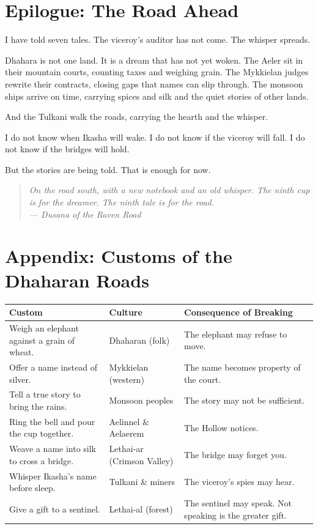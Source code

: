 \documentclass[10pt,twoside]{book}
\newcommand{\dusana}[1]{\begin{quote}\itshape #1 \\ --- Dusana of the Raven Road\end{quote}}
\begin{document}
\chapter*{Epilogue: The Road Ahead}

I have told seven tales. The viceroy's auditor has not come. The whisper spreads.

Dhahara is not one land. It is a dream that has not yet woken. The Aeler sit in their mountain courts, counting taxes and weighing grain. The Mykkielan judges rewrite their contracts, closing gaps that names can slip through. The monsoon ships arrive on time, carrying spices and silk and the quiet stories of other lands.

And the Tulkani walk the roads, carrying the hearth and the whisper.

I do not know when Ikasha will wake. I do not know if the viceroy will fall. I do not know if the bridges will hold.

But the stories are being told. That is enough for now.

\dusana{On the road south, with a new notebook and an old whisper. The ninth cup is for the dreamer. The ninth tale is for the road.}

\chapter*{Appendix: Customs of the Dhaharan Roads}

\begin{table}[h]
\centering
\begin{tabularx}{\textwidth}{p{4cm} p{4cm} X}
\toprule
\textbf{Custom} & \textbf{Culture} & \textbf{Consequence of Breaking} \\
\midrule
Weigh an elephant against a grain of wheat. & Dhaharan (folk) & The elephant may refuse to move. \\
Offer a name instead of silver. & Mykkielan (western) & The name becomes property of the court. \\
Tell a true story to bring the rains. & Monsoon peoples & The story may not be sufficient. \\
Ring the bell and pour the cup together. & Aelinnel \& Aelaerem & The Hollow notices. \\
Weave a name into silk to cross a bridge. & Lethai-ar (Crimson Valley) & The bridge may forget you. \\
Whisper Ikasha's name before sleep. & Tulkani \& miners & The viceroy's spies may hear. \\
Give a gift to a sentinel. & Lethai-al (forest) & The sentinel may speak. Not speaking is the greater gift. \\
\bottomrule
\end{tabularx}
\end{table}
\end{document}
